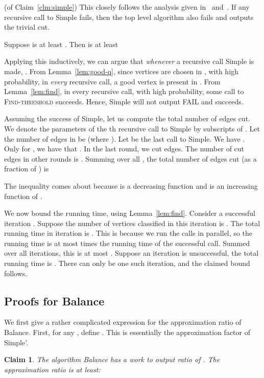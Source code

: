 \documentclass[11pt]{article}
\newtheorem{claim}[theorem]{Claim}
\newenvironment{myproof}{\noindent {\sc Proof:}}{}
\newcommand\Balance{{\sc Balance}\xspace}
\newcommand\Find{\textsc{Find-threshold}\xspace}
\newcommand\Simple{{\sc Simple}\xspace}
\begin{document}
\begin{myproof} (of Claim~\ref{clm:simple}) This closely follows the analysis given
in~\cite{Tre09} and~\cite{Sot09}.
If any recursive call to \Simple fails, then the top
level algorithm also fails and outputs the trivial cut.

Suppose  is at least .
Then  is at least

Applying this inductively, we can argue that \emph{whenever} a recursive call
{\Simple} is made,  .
From Lemma~\ref{lem:good-q}, since  vertices are chosen in ,
with high probability, in \emph{every} recursive call, a good vertex
is present in . From Lemma~\ref{lem:find}, in every recursive call,
with high probability, some call to {\Find} succeeds. Hence, {\Simple} will
not output FAIL and succeeds.

Assuming the success of {\Simple}, let us compute the total number of edges cut. We denote the parameters of the th
recursive call to {\Simple} by subscripts of . Let the number of edges
in  be  (where ). Let  be the last call to {\Simple}.
We have .
Only for , we have that .
In the last round, we cut
 edges.
The number of cut
edges in other rounds is .
Summing over all , the total number of edges cut (as a fraction of ) is

The inequality comes about because  is a decreasing function
and  is an increasing function of .

We now bound the running time, using Lemma~\ref{lem:find}. Consider a successful iteration .
Suppose the number of vertices classified in this iteration is .
The total running time in iteration  is
. This is because we run the  calls
in parallel, so the running time is at most  times
the running time of the successful call. Summed over all
iterations, this is at most . Suppose
an iteration is unsuccessful, the total running time
is . There can only be one such iteration,
and the claimed bound follows.
\end{myproof}


\subsection{Proofs for {\Balance}}

We first give a rather complicated expression for the approximation ratio
of {\Balance}. First, for any , define . This is essentially the approximation factor of \Simple'.

\begin{claim} \label{clm:threehalf} The algorithm {\Balance} has a work to output ratio
of . The approximation ratio
is at least:

\end{claim}
\end{document}
